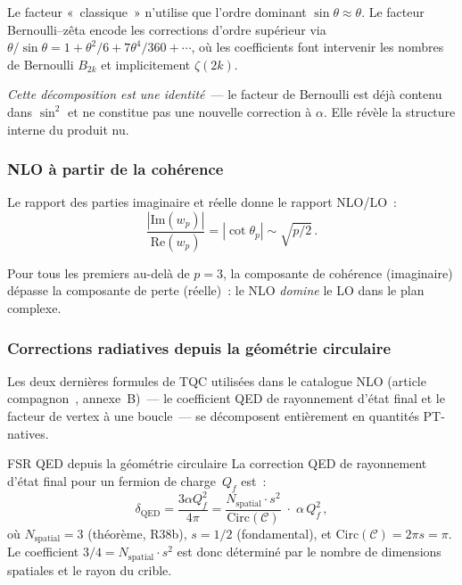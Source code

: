 \documentclass[12pt,a4paper]{article}
\begin{document}
Le facteur «~classique~» n'utilise que l'ordre dominant
$\sin\theta \approx \theta$. Le facteur Bernoulli--zêta encode les
corrections d'ordre supérieur via
$\theta/\sin\theta = 1 + \theta^2/6 + 7\theta^4/360 + \cdots$,
où les coefficients font intervenir les nombres de Bernoulli
$B_{2k}$ et implicitement $\zeta(2k)$.

\emph{Cette décomposition est une identité}~--- le facteur de
Bernoulli est déjà contenu dans $\sin^2$ et ne constitue pas une
nouvelle correction à $\alpha$. Elle révèle la structure interne du
produit nu.

\subsubsection{NLO à partir de la cohérence}

Le rapport des parties imaginaire et réelle donne le rapport
NLO/LO~:
\begin{equation}
  \frac{|\mathrm{Im}(w_p)|}{\mathrm{Re}(w_p)}
  = |\cot\theta_p|
  \sim \sqrt{p/2}\,.
  \label{eq:nlo_cot}
\end{equation}

Pour tous les premiers au-delà de $p = 3$, la composante de cohérence
(imaginaire) dépasse la composante de perte (réelle)~: le NLO
\emph{domine} le LO dans le plan complexe.


\subsubsection{Corrections radiatives depuis la géométrie circulaire}
\label{subsec:cx_radiative}

Les deux dernières formules de TQC utilisées dans le catalogue NLO
(article compagnon~\cite{companion_physics}, annexe~B)~--- le
coefficient QED de rayonnement d'état final et le facteur de vertex
à une boucle~--- se décomposent entièrement en quantités PT-natives.

\begin{derbox}{FSR QED depuis la géométrie circulaire}
\label{der:fsr_circle}
La correction QED de rayonnement d'état final pour un fermion de
charge~$Q_f$ est~:
\begin{equation}
  \delta_{\mathrm{QED}} = \frac{3\alpha Q_f^2}{4\pi}
  = \frac{N_{\mathrm{spatial}}\cdot s^2}{\mathrm{Circ}(\mathcal{C})}
  \;\cdot\;\alpha\,Q_f^2\,,
  \label{eq:fsr_pt}
\end{equation}
où $N_{\mathrm{spatial}} = 3$ (théorème, R38b),
$s = 1/2$ (fondamental), et
$\mathrm{Circ}(\mathcal{C}) = 2\pi s = \pi$.
Le coefficient $3/4 = N_{\mathrm{spatial}}\cdot s^2$ est donc
déterminé par le nombre de dimensions spatiales et le rayon du crible.
\end{derbox}
\end{document}
